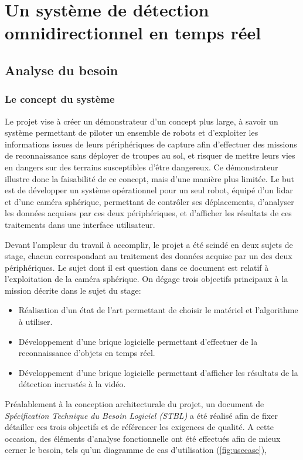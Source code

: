 \chapter{Un système de détection omnidirectionnel en temps réel}

	\section{Analyse du besoin}

		\subsection{Le concept du système}
			
			Le projet vise à créer un démonstrateur d'un concept plus large, à savoir un système permettant de piloter un ensemble de robots et d'exploiter les informations issues de leurs périphériques de capture afin d'effectuer des missions de reconnaissance sans déployer de troupes au sol, et risquer de mettre leurs vies en dangers sur des terrains susceptibles d'être dangereux. Ce démonstrateur illustre donc la faisabilité de ce concept, mais d'une manière plus limitée. Le but est de développer un système opérationnel pour un seul robot, équipé d'un \gls{lidar} et d'une caméra sphérique, permettant de contrôler ses déplacements, d'analyser les données acquises par ces deux périphériques, et d'afficher les résultats de ces traitements dans une interface utilisateur.
			\par
			Devant l'ampleur du travail à accomplir, le projet a été scindé en deux sujets de stage, chacun correspondant au traitement des données acquise par un des deux périphériques. Le sujet dont il est question dans ce document est relatif à l'exploitation de la caméra sphérique. On dégage trois objectifs principaux à la mission décrite dans le sujet du stage:
			\begin{itemize}[noitemsep]
				\item Réalisation d'un état de l'art permettant de choisir le matériel et l'algorithme à utiliser.
				\item Développement d'une brique logicielle permettant d'effectuer de la reconnaissance d'objets en temps réel.
				\item Développement d'une brique logicielle permettant d'afficher les résultats de la détection incrustés à la vidéo.
			\end{itemize}
			\par
			Préalablement à la conception architecturale du projet, un document de \emph{Spécification Technique du Besoin Logiciel (STBL)} a été réalisé afin de fixer détailler ces trois objectifs et de référencer les exigences de qualité. A cette occasion, des éléments d'analyse fonctionnelle ont été effectués afin de mieux cerner le besoin, tels qu'un diagramme de cas d'utilisation (\autoref{fig:usecase}),
			
